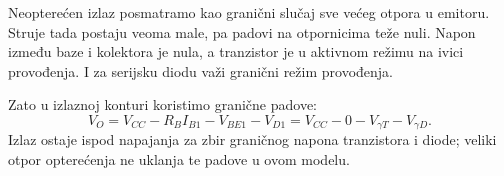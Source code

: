 Neopterećen izlaz posmatramo kao granični slučaj sve većeg otpora u emitoru. Struje tada postaju veoma male, pa padovi na otpornicima teže nuli. Napon između baze i kolektora je nula, a tranzistor je u aktivnom režimu na ivici provođenja. I za serijsku diodu važi granični režim provođenja.

Zato u izlaznoj konturi koristimo granične padove:
\[V_O=V_{CC}-R_BI_{B1}-V_{BE1}-V_{D1}=V_{CC}-0-V_{\gamma T}-V_{\gamma D}.\]
Izlaz ostaje ispod napajanja za zbir graničnog napona tranzistora i diode; veliki otpor opterećenja ne uklanja te padove u ovom modelu.
